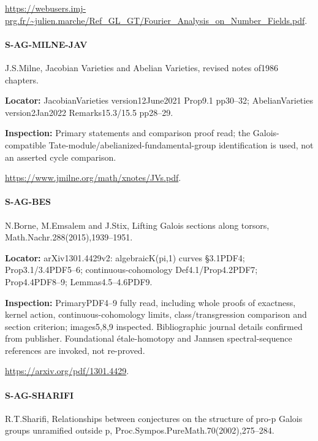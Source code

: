 \documentclass[11pt,a4paper]{article}
\begin{document}
\url{https://webusers.imj-prg.fr/~julien.marche/Ref_GL_GT/Fourier_Analysis_on_Number_Fields.pdf}.

\paragraph{S-AG-MILNE-JAV} J.\allowbreak{}S.\allowbreak{}Milne, Jacobian Varieties and Abelian Varieties, revised notes of1986 chapters.

\textbf{Locator:} JacobianVarieties version12June2021 Prop9.\allowbreak{}1 pp30–\allowbreak{}32; AbelianVarieties version2Jan2022 Remarks15.\allowbreak{}3/\allowbreak{}15.\allowbreak{}5 pp28–\allowbreak{}29.

\textbf{Inspection:} Primary statements and comparison proof read; the Galois-compatible Tate-module/\allowbreak{}abelianized-fundamental-group identification is used, not an asserted cycle comparison.\allowbreak{}

\url{https://www.jmilne.org/math/xnotes/JVs.pdf}.

\paragraph{S-AG-BES} N.\allowbreak{}Borne, M.\allowbreak{}Emsalem and J.\allowbreak{}Stix, Lifting Galois sections along torsors, Math.\allowbreak{}Nachr.\allowbreak{}288(2015),1939–\allowbreak{}1951.

\textbf{Locator:} arXiv1301.\allowbreak{}4429v2:\allowbreak{} algebraicK(pi,1) curves §3.\allowbreak{}1PDF4; Prop3.\allowbreak{}1/\allowbreak{}3.\allowbreak{}4PDF5–\allowbreak{}6; continuous-cohomology Def4.\allowbreak{}1/\allowbreak{}Prop4.\allowbreak{}2PDF7; Prop4.\allowbreak{}4PDF8–\allowbreak{}9; Lemmas4.\allowbreak{}5–\allowbreak{}4.\allowbreak{}6PDF9.

\textbf{Inspection:} PrimaryPDF4–\allowbreak{}9 fully read, including whole proofs of exactness, kernel action, continuous-cohomology limits, class/\allowbreak{}transgression comparison and section criterion; images5,8,9 inspected.\allowbreak{} Bibliographic journal details confirmed from publisher.\allowbreak{} Foundational étale-homotopy and Jannsen spectral-sequence references are invoked, not re-proved.\allowbreak{}

\url{https://arxiv.org/pdf/1301.4429}.

\paragraph{S-AG-SHARIFI} R.\allowbreak{}T.\allowbreak{}Sharifi, Relationships between conjectures on the structure of pro-p Galois groups unramified outside p, Proc.\allowbreak{}Sympos.\allowbreak{}PureMath.\allowbreak{}70(2002),275–\allowbreak{}284.
\end{document}
